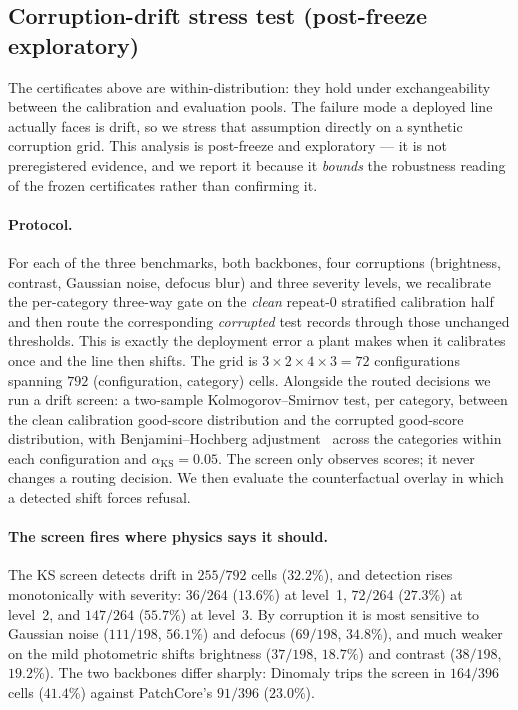 \documentclass[preprint,11pt]{elsarticle}
\begin{document}
\FloatBarrier

\subsection{Corruption-drift stress test (post-freeze exploratory)}
\label{sec:drift}

The certificates above are within-distribution: they hold under exchangeability between the
calibration and evaluation pools. The failure mode a deployed line actually faces is drift, so we
stress that assumption directly on a synthetic corruption grid. This analysis is post-freeze and
exploratory --- it is not preregistered evidence, and we report it because it \emph{bounds} the
robustness reading of the frozen certificates rather than confirming it.

\paragraph{Protocol.} For each of the three benchmarks, both backbones, four corruptions
(brightness, contrast, Gaussian noise, defocus blur) and three severity levels, we recalibrate the
per-category three-way gate on the \emph{clean} repeat-$0$ stratified calibration half and then route
the corresponding \emph{corrupted} test records through those unchanged thresholds. This is exactly
the deployment error a plant makes when it calibrates once and the line then shifts. The grid is
$3\times2\times4\times3=72$ configurations spanning $792$ (configuration, category) cells. Alongside
the routed decisions we run a drift screen: a two-sample Kolmogorov--Smirnov test, per category,
between the clean calibration good-score distribution and the corrupted good-score distribution, with
Benjamini--Hochberg adjustment~\citep{benjamini1995controlling} across the categories within each configuration and
$\alpha_{\text{KS}}=0.05$. The screen only observes scores; it never changes a routing decision. We
then evaluate the counterfactual overlay in which a detected shift forces refusal.

\paragraph{The screen fires where physics says it should.} The KS screen detects drift in $255/792$
cells ($32.2\%$), and detection rises monotonically with severity: $36/264$ ($13.6\%$) at level~1,
$72/264$ ($27.3\%$) at level~2, and $147/264$ ($55.7\%$) at level~3. By corruption it is most
sensitive to Gaussian noise ($111/198$, $56.1\%$) and defocus ($69/198$, $34.8\%$), and much weaker
on the mild photometric shifts brightness ($37/198$, $18.7\%$) and contrast ($38/198$, $19.2\%$).
The two backbones differ sharply: Dinomaly trips the screen in $164/396$ cells ($41.4\%$) against
PatchCore's $91/396$ ($23.0\%$).
\end{document}
